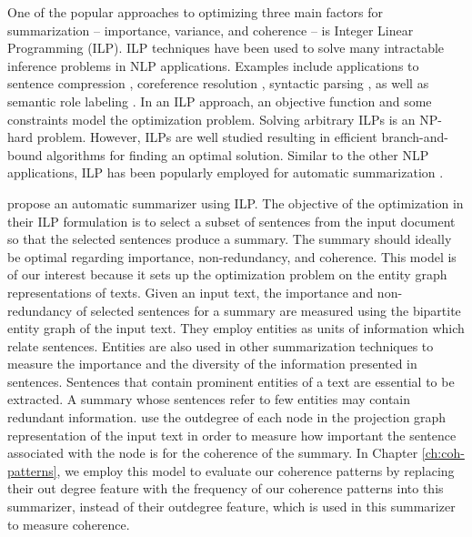 One of the popular approaches to optimizing three main factors for summarization -- importance, variance, and coherence -- is Integer Linear Programming (ILP). 
ILP techniques have been used to solve many intractable inference problems in NLP applications. 
Examples include applications to sentence compression \cite{clarke10,filippova13}, coreference resolution \cite{denis09},  syntactic parsing \cite{klenner07a}, as well as semantic role labeling \cite{punyakanok04b}. 
In an ILP approach, an objective function and some constraints model the optimization problem.  
Solving arbitrary ILPs is an \mbox{NP-hard} problem. 
However, ILPs are well studied resulting in efficient \mbox{branch-and-bound} algorithms for finding an optimal solution. 
Similar to the other NLP applications, ILP has been popularly employed for automatic summarization 
\cite{nishikawa10,galanis12,marciniak05b,mcdonald07,berg-kirkpatrick11,woodsend12,lichen13a,hirao13}.  

 propose an automatic summarizer using ILP.  
The objective of the optimization in their ILP formulation is to select a subset of sentences from the input document so that the selected sentences produce a summary.
The summary should ideally be optimal regarding importance, non-redundancy, and coherence. 
This model is of our interest because it sets up the optimization problem on the entity graph representations of texts. 
Given an input text, the importance and non-redundancy of selected sentences for a summary are measured using the bipartite entity graph of the input text. 
They employ entities as units of information which relate sentences. 
Entities are also used in other summarization techniques to measure the importance and the diversity of the information presented in sentences.   
Sentences that contain prominent entities of a text are essential to be extracted. 
A summary whose sentences refer to few entities may contain redundant information. 
 use the outdegree of each node in the projection graph representation of the input text in order to measure how important the sentence associated with the node is for the coherence of the summary.  
In Chapter \ref{ch:coh-patterns}, we employ this model to evaluate our coherence patterns by replacing their out degree feature with the frequency of our coherence patterns into this summarizer, instead of their outdegree feature, which is used in this summarizer to measure coherence. 


